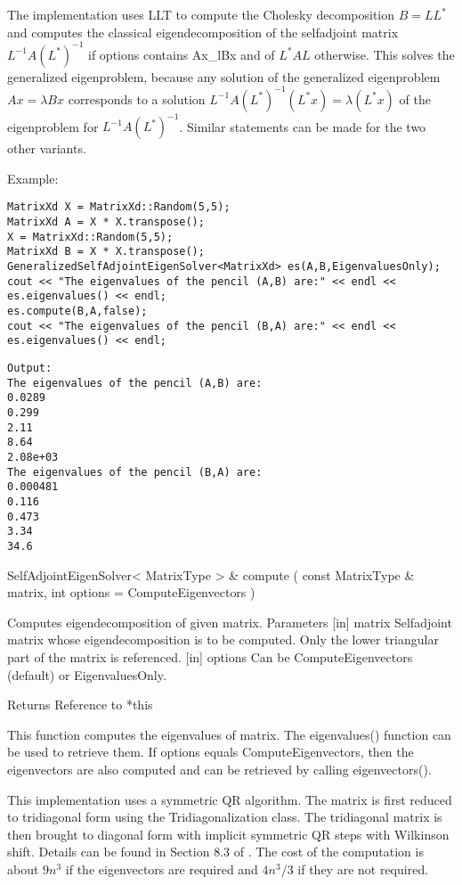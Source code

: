 The implementation uses LLT to compute the Cholesky decomposition $B=L L^*$ and computes the classical eigendecomposition of the selfadjoint matrix $L^{-1} A (L^*)^{-1}$ if options contains Ax\_lBx and of $L^* A L$ otherwise. This solves the generalized eigenproblem, because any solution of the generalized eigenproblem $A x = \lambda B x$ corresponds to a solution $L^{-1} A(L^*)^{-1} (L^* x) = \lambda(L^* x)$ of the eigenproblem for $L^{-1}A(L^*)^{-1}$. Similar statements can be made for the two other variants.



Example:
\begin{lstlisting}
MatrixXd X = MatrixXd::Random(5,5);
MatrixXd A = X * X.transpose();
X = MatrixXd::Random(5,5);
MatrixXd B = X * X.transpose();
GeneralizedSelfAdjointEigenSolver<MatrixXd> es(A,B,EigenvaluesOnly);
cout << "The eigenvalues of the pencil (A,B) are:" << endl << es.eigenvalues() << endl;
es.compute(B,A,false);
cout << "The eigenvalues of the pencil (B,A) are:" << endl << es.eigenvalues() << endl;
\end{lstlisting}

\begin{verbatim}
Output:
The eigenvalues of the pencil (A,B) are:
0.0289
0.299
2.11
8.64
2.08e+03
The eigenvalues of the pencil (B,A) are:
0.000481
0.116
0.473
3.34
34.6
\end{verbatim}


SelfAdjointEigenSolver< MatrixType > \& compute  ( const MatrixType \&  matrix,   int  options = ComputeEigenvectors )   

Computes eigendecomposition of given matrix. 
Parameters
[in] matrix Selfadjoint matrix whose eigendecomposition is to be computed. Only the lower triangular part of the matrix is referenced.  
[in] options Can be ComputeEigenvectors (default) or EigenvaluesOnly.  

Returns Reference to *this 

This function computes the eigenvalues of matrix. The eigenvalues() function can be used to retrieve them. If options equals ComputeEigenvectors, then the eigenvectors are also computed and can be retrieved by calling eigenvectors().

This implementation uses a symmetric QR algorithm. The matrix is first reduced to tridiagonal form using the Tridiagonalization class. The tridiagonal matrix is then brought to diagonal form with implicit symmetric QR steps with Wilkinson shift. Details can be found in Section 8.3 of  \cite{Golub1996}.
The cost of the computation is about $9n^3$ if the eigenvectors are required and $4n^3/3$ if they are not required.

